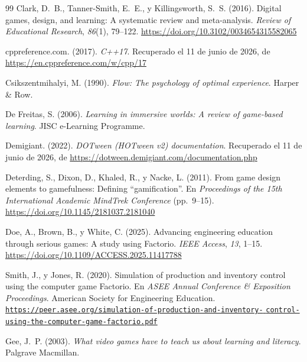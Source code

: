 \documentclass[a4paper,12pt]{article}
\begin{document}
\begin{thebibliography}{99}
Clark, D.~B., Tanner-Smith, E.~E., y Killingsworth, S.~S. (2016). Digital games, design, and learning: A systematic review and meta-analysis. \textit{Review of Educational Research}, \textit{86}(1), 79--122. \url{https://doi.org/10.3102/0034654315582065}

cppreference.com. (2017). \textit{C++17}. Recuperado el 11 de junio de 2026, de \url{https://en.cppreference.com/w/cpp/17}

Csikszentmihalyi, M. (1990). \textit{Flow: The psychology of optimal experience}. Harper \& Row.

De Freitas, S. (2006). \textit{Learning in immersive worlds: A review of game-based learning}. JISC e-Learning Programme.

Demigiant. (2022). \textit{DOTween (HOTween v2) documentation}. Recuperado el 11 de junio de 2026, de \url{https://dotween.demigiant.com/documentation.php}

Deterding, S., Dixon, D., Khaled, R., y Nacke, L. (2011). From game design elements to gamefulness: Defining ``gamification''. En \textit{Proceedings of the 15th International Academic MindTrek Conference} (pp.~9--15). \url{https://doi.org/10.1145/2181037.2181040}

Doe, A., Brown, B., y White, C. (2025). Advancing engineering education through serious games: A study using Factorio. \textit{IEEE Access}, \textit{13}, 1--15. \url{https://doi.org/10.1109/ACCESS.2025.11417788}

Smith, J., y Jones, R. (2020). Simulation of production and inventory control using the computer game Factorio. En \textit{ASEE Annual Conference \& Exposition Proceedings}. American Society for Engineering Education.
\href{https://peer.asee.org/simulation-of-production-and-inventory-control-using-the-computer-game-factorio.pdf}{%
\nolinkurl{https://peer.asee.org/simulation-of-production-and-inventory-}%
\newline
\nolinkurl{control-using-the-computer-game-factorio.pdf}%
}

Gee, J.~P. (2003). \textit{What video games have to teach us about learning and literacy}. Palgrave Macmillan.


\end{thebibliography}
\end{document}
